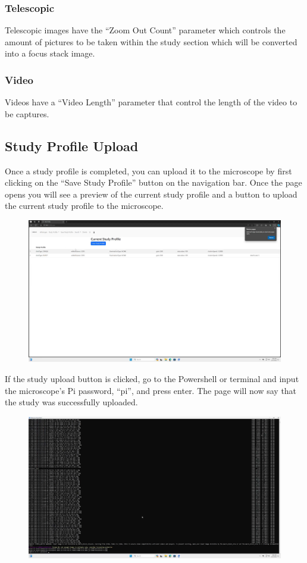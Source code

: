 \documentclass[12pt]{article}
\begin{document}
\begin{center}
	\subsubsection{Telescopic}
	Telescopic images have the ``Zoom Out Count'' parameter which controls the amount of pictures to be taken within the study section which will be converted into a focus stack image.
	\subsubsection{Video}
	Videos have a ``Video Length'' parameter that control the length of the video to be captures.
	\subsection{Study Profile Upload}
	Once a study profile is completed, you can upload it to the microscope by first clicking on the ``Save Study Profile'' button on the navigation bar. Once the page opens you will see a preview of the current study profile and a button to upload the current study profile to the microscope.
	\begin{figure}[H]
		\includegraphics[width=\textwidth]{Figures/Save-Study-Profile.png}
	\end{figure}
	If the study upload button is clicked, go to the Powershell or terminal and input the microscope's Pi password, ``pi'', and press enter. The page will now say that the study was successfully uploaded.
	\begin{figure}[H]
		\includegraphics[width=\textwidth]{Figures/Save-Study-Profile-SSH-Password.png}
	\end{figure}

\end{center}
\end{document}
